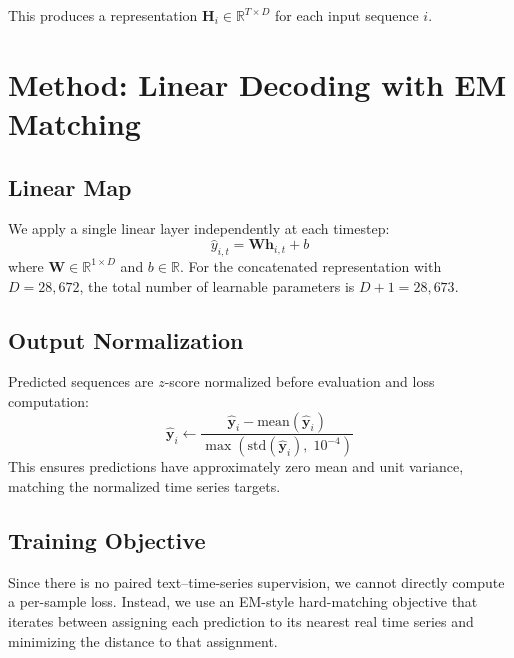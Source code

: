 \documentclass[11pt,a4paper]{article}
\newcommand{\R}{\mathbb{R}}
\newcommand{\bW}{\mathbf{W}}
\newcommand{\bh}{\mathbf{h}}
\newcommand{\byhat}{\hat{\mathbf{y}}}
\begin{document}
This produces a representation $\mathbf{H}_i \in \R^{T \times D}$ for each input sequence $i$.

\section{Method: Linear Decoding with EM Matching}

\subsection{Linear Map}

We apply a single linear layer independently at each timestep:
\begin{equation}\label{eq:linear-map}
    \hat{y}_{i,t} = \bW \bh_{i,t} + b
\end{equation}
where $\bW \in \R^{1 \times D}$ and $b \in \R$.
For the concatenated representation with $D = 28{,}672$, the total number of learnable parameters is $D + 1 = 28{,}673$.

\subsection{Output Normalization}

Predicted sequences are $z$-score normalized before evaluation and loss computation:
\begin{equation}
    \byhat_i \leftarrow \frac{\byhat_i - \text{mean}(\byhat_i)}{\max\!\left(\text{std}(\byhat_i),\; 10^{-4}\right)}
\end{equation}
This ensures predictions have approximately zero mean and unit variance, matching the normalized time series targets.

\subsection{Training Objective}

Since there is no paired text--time-series supervision, we cannot directly compute a per-sample loss.
Instead, we use an EM-style hard-matching objective that iterates between assigning each prediction to its nearest real time series and minimizing the distance to that assignment.
\end{document}
